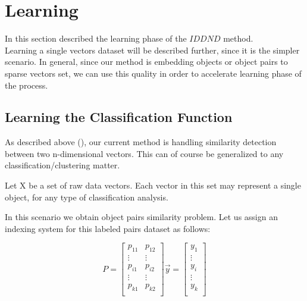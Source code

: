 
\chapter{Learning} %

\label{Chapter7} %


In this section described the learning phase of the $IDDND$ method.\\
Learning a single vectors dataset will be described further, since it is the simpler scenario.
In general, since our method is embedding objects or object pairs to sparse vectors set, we can use this quality in order to accelerate learning phase of the process.


\section{Learning the Classification Function}

As described above (), our current method is handling similarity detection between two n-dimensional vectors. This can of course be generalized to any classification/clustering matter.

Let X be a set of raw data vectors. Each vector in this set may represent a single object, for any type of classification analysis. 

In this scenario we obtain object pairs similarity problem.
Let us assign an indexing system for this labeled pairs dataset as follows:

\begin{equation}
P = \begin{bmatrix}
p_{11} & p_{12}\\ 
 \vdots & \vdots \\ 
p_{i1} & p_{i2}\\ 
 \vdots & \vdots \\ 
p_{k1} & p_{k2}\\ 
\end{bmatrix}
\overrightarrow{y} = \begin{bmatrix}
y_{1} \\ 
 \vdots  \\ 
y_{i} \\ 
 \vdots  \\ 
y_{k} \\ 
\end{bmatrix}
\end{equation}

